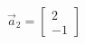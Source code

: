 \documentclass[preview]{standalone}
\begin{document}
\begin{align*}
\vec{a}_2=\begin{bmatrix} 2 \\ -1 \end{bmatrix}
\end{align*}
\end{document}
